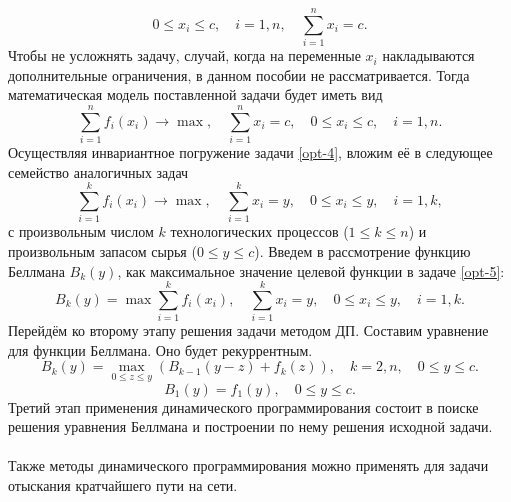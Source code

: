 \documentclass[a4paper, 12pt]{report}
\numberwithin{equation}{section}
\renewcommand{\leq}{\leqslant}
\begin{document}
\[
0 \leq x_i \leq c, \quad i=1,n, \quad \sum_{i=1}^n x_i = c.
\]
Чтобы не усложнять задачу, случай, когда на переменные $x_i$ накладываются дополнительные ограничения, в данном пособии не рассматривается. Тогда математическая модель поставленной задачи будет иметь вид
\begin{equation}
\label{opt-4}
    \sum_{i=1}^n f_i(x_i) \to \max, \quad \sum_{i=1}^n x_i = c, \quad 0 \leq x_i \leq c, \quad i = 1, n.
\end{equation}
Осуществляя инвариантное погружение задачи \eqref{opt-4}, вложим её в следующее семейство аналогичных задач
\begin{equation}
\label{opt-5}
    \sum_{i=1}^k f_i(x_i) \to \max, \quad \sum_{i=1}^k x_i = y, \quad 0 \leq x_i \leq y, \quad i = 1, k,
\end{equation}
с произвольным числом $k$ технологических процессов ($1 \leq k \leq n$) и произвольным запасом сырья ($0 \leq y \leq c$). Введем в рассмотрение функцию Беллмана $B_k(y)$, как максимальное значение целевой функции в задаче \eqref{opt-5}:
\begin{equation}
    B_k(y) = \max \sum_{i=1}^k f_i(x_i), \quad \sum_{i=1}^k x_i = y, \quad 0 \leq x_i \leq y, \quad i = 1, k.
\end{equation}
Перейдём ко второму этапу решения задачи методом ДП. Составим уравнение для функции Беллмана. Оно будет рекуррентным.
\begin{equation}
    B_k(y) = \max_{0 \leq z \leq y} \left( B_{k-1}(y-z) + f_k(z) \right), \quad k = 2, n, \quad 0 \leq y \leq c.
\end{equation}
\begin{equation}
    B_1(y) = f_1(y), \quad 0 \leq y \leq c.
\end{equation}
Третий этап применения динамического программирования состоит в поиске решения
уравнения Беллмана и построении по нему решения исходной задачи.
\\\\
Также методы динамического программирования можно применять для задачи отыскания кратчайшего пути на сети.
\end{document}
